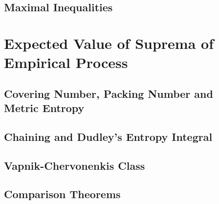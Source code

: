 \documentclass[11pt]{article}
\begin{document}
\subsection{Maximal Inequalities}


\section{Expected Value of Suprema of Empirical Process}
\subsection{Covering Number, Packing Number and Metric Entropy}
\subsection{Chaining and Dudley's Entropy Integral}
\subsection{Vapnik-Chervonenkis Class}
\subsection{Comparison Theorems}




\newpage


\end{document}
